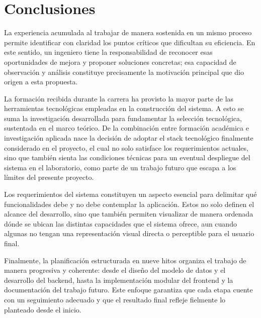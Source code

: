 \section{Conclusiones}

La experiencia acumulada al trabajar de manera sostenida en un mismo proceso permite identificar con claridad los puntos críticos que dificultan su eficiencia. En este sentido, un ingeniero tiene la responsabilidad de reconocer esas oportunidades de mejora y proponer soluciones concretas; esa capacidad de observación y análisis constituye precisamente la motivación principal que dio origen a esta propuesta.

La formación recibida durante la carrera ha provisto la mayor parte de las herramientas tecnológicas empleadas en la construcción del sistema. A esto se suma la investigación desarrollada para fundamentar la selección tecnológica, sustentada en el marco teórico. De la combinación entre formación académica e investigación aplicada nace la decisión de adoptar el stack tecnológico finalmente considerado en el proyecto, el cual no solo satisface los requerimientos actuales, sino que también sienta las condiciones técnicas para un eventual despliegue del sistema en el laboratorio, como parte de un trabajo futuro que escapa a los límites del presente proyecto.

Los requerimientos del sistema constituyen un aspecto esencial para delimitar qué funcionalidades debe y no debe contemplar la aplicación. Estos no solo definen el alcance del desarrollo, sino que también permiten visualizar de manera ordenada dónde se ubican las distintas capacidades que el sistema ofrece, aun cuando algunas no tengan una representación visual directa o perceptible para el usuario final.

Finalmente, la planificación estructurada en nueve hitos organiza el trabajo de manera progresiva y coherente: desde el diseño del modelo de datos y el desarrollo del backend, hasta la implementación modular del frontend y la documentación del trabajo futuro. Este enfoque garantiza que cada etapa cuente con un seguimiento adecuado y que el resultado final refleje fielmente lo planteado desde el inicio.